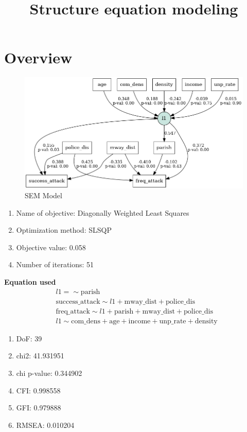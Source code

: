 \documentclass[10pt, conference, compsocconf]{IEEEtran}
\title{Structure equation modeling}
\begin{document}
	
	
	\maketitle
	
	\section{Overview}	
	\begin{figure}[h!]
		\centering
		\includegraphics[width=\linewidth]{semresult2.png}
		\caption{SEM Model}
		\label{fig:Model}
	\end{figure}
	

	
	\begin{enumerate}
		\item Name of objective: Diagonally Weighted Least Squares 
		\item  Optimization method: SLSQP
		\item  Objective value: 0.058
		\item  Number of iterations: 51
	\end{enumerate}	
	\textbf{Equation used}
\begin{align}
	& l1 =\sim \text{parish} \\
	& \text{success\_attack} \sim l1 + \text{mway\_dist} + \text{police\_dis} \\
	& \text{freq\_attack} \sim l1 + \text{parish} + \text{mway\_dist} + \text{police\_dis} \\
	& l1 \sim \text{com\_dens} + \text{age} + \text{income} + \text{unp\_rate} + \text{density} 
\end{align}

	
	\begin{enumerate}
		\item DoF: 39
		\item chi2: 41.931951
		\item chi p-value: 0.344902
		\item CFI: 0.998558
		\item GFI: 0.979888
		\item RMSEA: 0.010204
	\end{enumerate}
	
\end{document}
